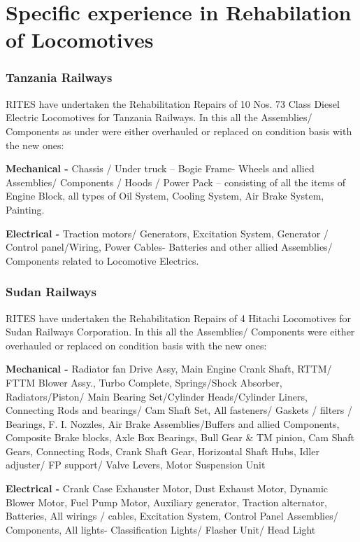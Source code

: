 \section{Specific experience in Rehabilation of Locomotives}

\subsubsection{Tanzania Railways}
RITES have undertaken the Rehabilitation Repairs of 10 Nos. 73 Class Diesel Electric Locomotives for
Tanzania Railways. In this all the Assemblies/ Components as under were either overhauled or replaced on condition
basis with the new ones:


\textbf{Mechanical - }Chassis / Under truck -- Bogie Frame- Wheels and allied Assemblies/ Components / Hoods / Power
Pack -- consisting of all the items of Engine Block, all types of Oil System, Cooling System, Air Brake System,
Painting.

\bigskip

\textbf{Electrical - }Traction motors/ Generators, Excitation System, Generator / Control panel/Wiring, Power Cables-
Batteries and other allied Assemblies/ Components related to Locomotive Electrics.

\bigskip
\subsubsection{Sudan Railways}
RITES have undertaken the Rehabilitation Repairs of 4 Hitachi Locomotives for Sudan Railways
Corporation. In this all the Assemblies/ Components were either overhauled or replaced on condition basis with the new
ones:


\textbf{Mechanical - }Radiator fan Drive Assy, Main Engine Crank Shaft, RTTM/ FTTM Blower Assy., Turbo Complete,
Springs/Shock Absorber, Radiators/Piston/ Main Bearing Set/Cylinder Heads/Cylinder Liners, Connecting Rods and
bearings/ Cam Shaft Set, All fasteners/ Gaskets / filters / Bearings, F. I. Nozzles, Air Brake Assemblies/Buffers and
allied Components, Composite Brake blocks, Axle Box Bearings, Bull Gear \& TM pinion, Cam Shaft Gears, Connecting Rods,
Crank Shaft Gear, Horizontal Shaft Hubs, Idler adjuster/ FP support/ Valve Levers, Motor Suspension Unit


\bigskip


\textbf{Electrical - }Crank Case Exhauster Motor, Dust Exhaust Motor, Dynamic Blower Motor, Fuel Pump Motor, Auxiliary
generator, Traction alternator, Batteries, All wirings / cables, Excitation System, Control Panel Assemblies/
Components, All lights- Classification Lights/ Flasher Unit/ Head Light
\bigskip


